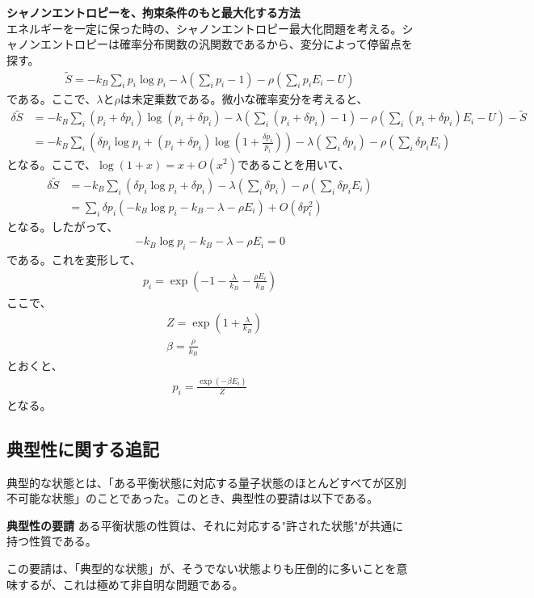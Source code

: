 \documentclass[a4paper,11pt]{jsarticle}
\numberwithin{equation}{section}
\begin{document}
\textbf{シャノンエントロピーを、拘束条件のもと最大化する方法}\\
エネルギーを一定に保った時の、シャノンエントロピー最大化問題を考える。シャノンエントロピーは確率分布関数の汎関数であるから、変分によって停留点を探す。
\begin{align}
  \tilde{S}= -k_B\sum_{i}p_i\log p_i -\lambda\left(\sum_{i}p_i - 1\right)-\rho\left(\sum_{i}p_iE_i - U\right)  
\end{align}
である。ここで、$\lambda$と$\rho$は未定乗数である。微小な確率変分を考えると、
\begin{align}
  \delta \tilde{S} &= -k_B\sum_{i}(p_i + \delta p_i)\log (p_i + \delta p_i) -\lambda\left(\sum_{i}(p_i + \delta p_i)- 1\right) -\rho\left(\sum_{i}(p_i + \delta p_i)E_i - U\right)-\tilde{S}\\
  &= -k_B\sum_{i}\left(\delta p_i\log p_i + (p_i + \delta p_i)\log \left(1 + \frac{\delta p_i}{p_i}\right)\right)  -\lambda\left(\sum_{i}\delta p_i\right)-\rho\left(\sum_{i}\delta p_iE_i\right)
\end{align}
となる。ここで、$\log(1+x) = x + O(x^2)$であることを用いて、
\begin{align}
  \delta \tilde{S} &= -k_B\sum_{i}\left(\delta p_i\log p_i + \delta p_i\right)  -\lambda\left(\sum_{i}\delta p_i\right)-\rho\left(\sum_{i}\delta p_iE_i\right)\\
  &= \sum_{i}\delta p_i\left(-k_B\log p_i - k_B - \lambda - \rho E_i\right) + O(\delta p_i^2)
\end{align}
となる。したがって、
\begin{align}
  -k_B\log p_i - k_B - \lambda - \rho E_i = 0
\end{align}
である。これを変形して、
\begin{align}
  p_i = \exp(-1-\frac{\lambda}{k_B}-\frac{\rho E_i}{k_B})
\end{align}
ここで、
\begin{align}
  &Z = \exp(1 + \frac{\lambda}{k_B})\\
  &\beta = \frac{\rho}{k_B}
\end{align}
とおくと、
\begin{align}
  p_i = \frac{\exp(-\beta E_i)}{Z}
\end{align}
となる。

\subsection{典型性に関する追記}
典型的な状態とは、「ある平衡状態に対応する量子状態のほとんどすべてが区別不可能な状態」のことであった。このとき、典型性の要請は以下である。
\begin{itembox}[l]{\textbf{典型性の要請}}
  ある平衡状態の性質は、それに対応する"許された状態"が共通に持つ性質である。
\end{itembox}
この要請は、「典型的な状態」が、そうでない状態よりも圧倒的に多いことを意味するが、これは極めて非自明な問題である。
\end{document}
